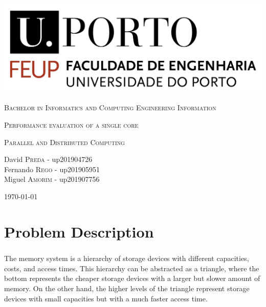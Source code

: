 \documentclass{report}
\begin{document}
	\begin{titlepage}
		\centering
		\includegraphics[scale=0.35]{logo_feup.png}\linebreak
		
		\vspace{1cm}
		
		{\scshape \large Bachelor in Informatics and Computing Engineering
		Information}
		
		\vspace {1cm}
		
		{\scshape\Huge Performance evaluation of a single core \par}
		
		\vfill
		
		{\scshape \large Parallel and Distributed Computing}
		
		\vfill
		
		\Large David \textsc{Preda} - up201904726 \\ Fernando \textsc{Rego} - up201905951 \\ Miguel \textsc{Amorim} - up201907756
		
		\vspace{1cm}
		
		\today
		
	\end{titlepage}

	\tableofcontents
	
	\chapter{Problem Description}
			\paragraph{} The memory system is a hierarchy of storage devices with different capacities, costs, and access times. This hierarchy can be abstracted as a triangle, where the bottom represents the cheaper storage devices with a larger but slower amount of memory. On the other hand, the higher levels of the triangle represent storage devices with small capacities but with a much faster access time.
			
\end{document}
